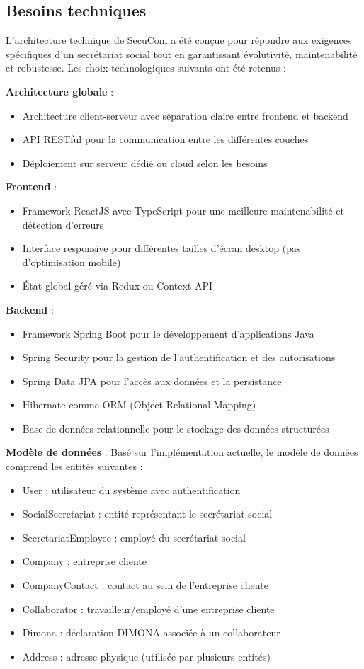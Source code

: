 \documentclass[12pt,a4paper]{report}
\begin{document}
\subsection{Besoins techniques}

L'architecture technique de SecuCom a été conçue pour répondre aux exigences spécifiques d'un secrétariat social tout en garantissant évolutivité, maintenabilité et robustesse. Les choix technologiques suivants ont été retenus :

\textbf{Architecture globale} :
\begin{itemize}
  \item Architecture client-serveur avec séparation claire entre frontend et backend
  \item API RESTful pour la communication entre les différentes couches
  \item Déploiement sur serveur dédié ou cloud selon les besoins
\end{itemize}

\textbf{Frontend} :
\begin{itemize}
  \item Framework ReactJS avec TypeScript pour une meilleure maintenabilité et détection d'erreurs
  \item Interface responsive pour différentes tailles d'écran desktop (pas d'optimisation mobile)
  \item État global géré via Redux ou Context API
\end{itemize}

\textbf{Backend} :
\begin{itemize}
  \item Framework Spring Boot pour le développement d'applications Java
  \item Spring Security pour la gestion de l'authentification et des autorisations
  \item Spring Data JPA pour l'accès aux données et la persistance
  \item Hibernate comme ORM (Object-Relational Mapping)
  \item Base de données relationnelle pour le stockage des données structurées
\end{itemize}

\textbf{Modèle de données} :
Basé sur l'implémentation actuelle, le modèle de données comprend les entités suivantes :
\begin{itemize}
  \item User : utilisateur du système avec authentification
  \item SocialSecretariat : entité représentant le secrétariat social
  \item SecretariatEmployee : employé du secrétariat social
  \item Company : entreprise cliente
  \item CompanyContact : contact au sein de l'entreprise cliente
  \item Collaborator : travailleur/employé d'une entreprise cliente
  \item Dimona : déclaration DIMONA associée à un collaborateur
  \item Address : adresse physique (utilisée par plusieurs entités)
\end{itemize}
\end{document}
